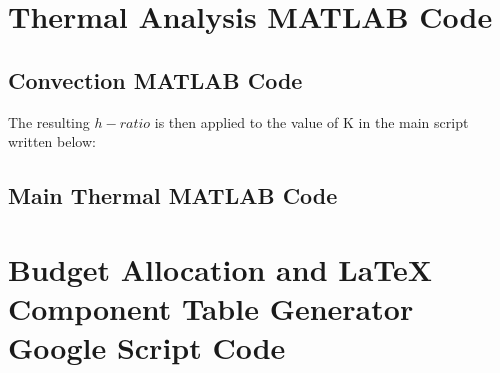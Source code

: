 \documentclass[a4paper,12pt,twoside]{article}
\begin{document}
\begin{appendices}


\newpage
\section{Thermal Analysis MATLAB Code} \label{sec:appJ}
\subsection{Convection MATLAB Code}



The resulting $h-ratio$ is then applied to the value of K in the main script written below:

\subsection{Main Thermal MATLAB Code}




\newpage
\section{Budget Allocation and LaTeX Component Table Generator Google Script Code} \label{sec:appK}

\end{appendices}
\end{document}
